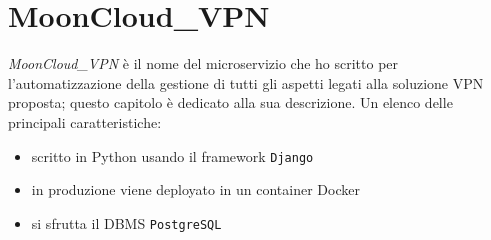 \chapter{MoonCloud\_VPN}\label{ch:microservice}
\textit{MoonCloud\_VPN} è il nome del microservizio
che ho scritto per l'automatizzazione della gestione di tutti gli aspetti legati
alla soluzione VPN proposta; questo capitolo è dedicato alla sua descrizione.
Un elenco delle principali caratteristiche:
\begin{itemize}
  \item scritto in Python usando il framework \texttt{Django}
  \item in produzione viene deployato in un container Docker
  \item si sfrutta il DBMS \texttt{PostgreSQL}
\end{itemize}



